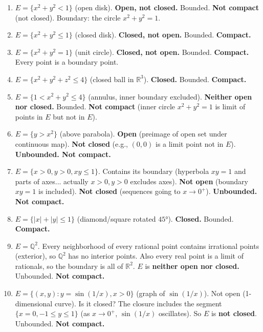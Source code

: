 \documentclass[12pt,a4paper]{article}
\begin{document}
\begin{enumerate}[leftmargin=*, label=(\alph*)]

\item $E=\{x^2+y^2<1\}$ (open disk). \textbf{Open, not closed.} Bounded. \textbf{Not compact} (not closed). Boundary: the circle $x^2+y^2=1$.

\item $E=\{x^2+y^2\le 1\}$ (closed disk). \textbf{Closed, not open.} Bounded. \textbf{Compact.}

\item $E=\{x^2+y^2=1\}$ (unit circle). \textbf{Closed, not open.} Bounded. \textbf{Compact.} Every point is a boundary point.

\item $E=\{x^2+y^2+z^2\le 4\}$ (closed ball in $\mathbb{R}^3$). \textbf{Closed.} Bounded. \textbf{Compact.}

\item $E=\{1<x^2+y^2\le 4\}$ (annulus, inner boundary excluded). \textbf{Neither open nor closed.} Bounded. \textbf{Not compact} (inner circle $x^2+y^2=1$ is limit of points in $E$ but not in $E$).

\item $E=\{y>x^2\}$ (above parabola). \textbf{Open} (preimage of open set under continuous map). \textbf{Not closed} (e.g., $(0,0)$ is a limit point not in $E$). \textbf{Unbounded. Not compact.}

\item $E=\{x>0, y>0, xy\le 1\}$. Contains its boundary (hyperbola $xy=1$ and parts of axes... actually $x>0,y>0$ excludes axes). \textbf{Not open} (boundary $xy=1$ is included). \textbf{Not closed} (sequences going to $x\to 0^+$). \textbf{Unbounded. Not compact.}

\item $E=\{|x|+|y|\le 1\}$ (diamond/square rotated $45°$). \textbf{Closed.} Bounded. \textbf{Compact.}

\item $E=\mathbb{Q}^2$. Every neighborhood of every rational point contains irrational points (exterior), so $\mathbb{Q}^2$ has no interior points. Also every real point is a limit of rationals, so the boundary is all of $\mathbb{R}^2$. $E$ is \textbf{neither open nor closed.} Unbounded. \textbf{Not compact.}

\item $E=\{(x,y):y=\sin(1/x),x>0\}$ (graph of $\sin(1/x)$). Not open (1-dimensional curve). Is it closed? The closure includes the segment $\{x=0,-1\le y\le 1\}$ (as $x\to 0^+$, $\sin(1/x)$ oscillates). So $E$ is \textbf{not closed}. Unbounded. \textbf{Not compact.}

\end{enumerate}
\end{document}
